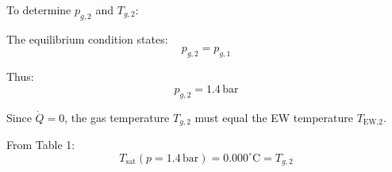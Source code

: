 To determine \( p_{g,2} \) and \( T_{g,2} \):  

The equilibrium condition states:  
\[
p_{g,2} = p_{g,1}
\]  

Thus:  
\[
p_{g,2} = 1.4 \, \text{bar}
\]  

Since \( \dot{Q} = 0 \), the gas temperature \( T_{g,2} \) must equal the EW temperature \( T_{\text{EW,2}} \).  

From Table 1:  
\[
T_{\text{sat}}(p = 1.4 \, \text{bar}) = 0.000^\circ\text{C} = T_{g,2}
\]